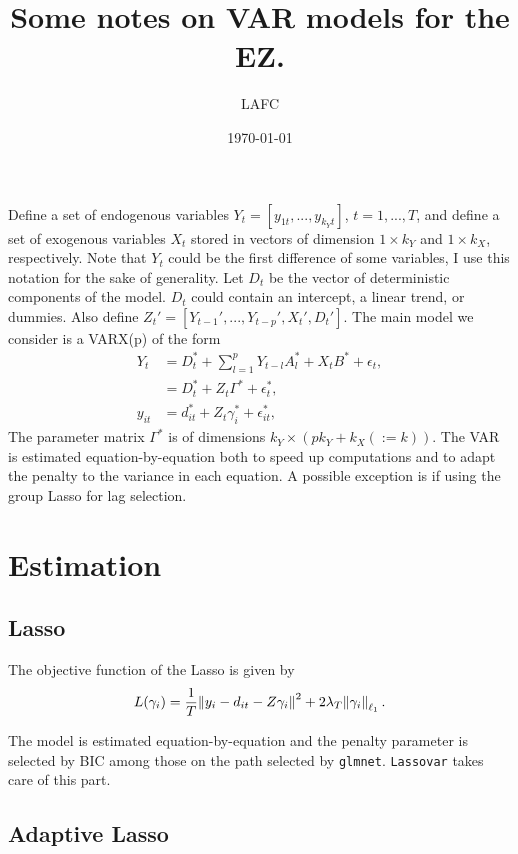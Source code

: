 \documentclass[11pt,oneside, a4paper]{amsart}
\begin{document}

	
\title{Some notes on VAR models for the EZ.}   
\author{LAFC}
\date{\today}
\maketitle

Define a set of endogenous variables $Y_t=[y_{1t},...,y_{k_Y t}]$, $t=1,...,T$, and define a set of exogenous variables $X_t$ stored in vectors of dimension $1\times k_Y$ and $1\times k_X$, respectively. Note that $Y_t$ could be the first difference of some variables, I use this notation for the sake of generality. Let $D_t$ be the vector of deterministic components of the model. $D_t$ could contain an intercept, a linear trend, or dummies. Also define $Z_t'=[Y_{t-1}',...,Y_{t-p}',X_{t}',D_t']$. The main model we consider is a VARX(p) of the form
\begin{align}
 Y_t &= D_t^* + \sum_{l=1}^p  Y_{t-l}A_l^* + X_t B^* + \epsilon_t,\nonumber\\
    &= D_t^* + Z_t \Gamma^* + \epsilon_t^*,\nonumber\\
 y_{it}&= d_{it}^* + Z_{t} \gamma_i^* + \epsilon_{it}^*,\label{eq:var}
\end{align}
The parameter matrix $\Gamma^*$ is of dimensions $ k_Y \times \left(pk_Y+k_X (:=k) \right)$. The VAR is estimated equation-by-equation both to speed up computations and to adapt the penalty to the variance in each equation. A possible exception is if using the group Lasso for lag selection.   


\section*{Estimation}

\subsection*{Lasso}
The objective function of the Lasso is given by 
\begin{align}
L(\gamma_{i})=\frac{1}{T}\enVert{y_{i}-d_{it}-Z\gamma_{i}}^2+2\lambda_T\enVert{\gamma_{i}}_{\ell_1}\label{eq:obj}.
\end{align}

The model is estimated equation-by-equation and the penalty parameter is selected by BIC among those on the path selected by \texttt{glmnet}. \texttt{Lassovar} takes care of this part.  

\subsection*{Adaptive Lasso}
\end{document}
